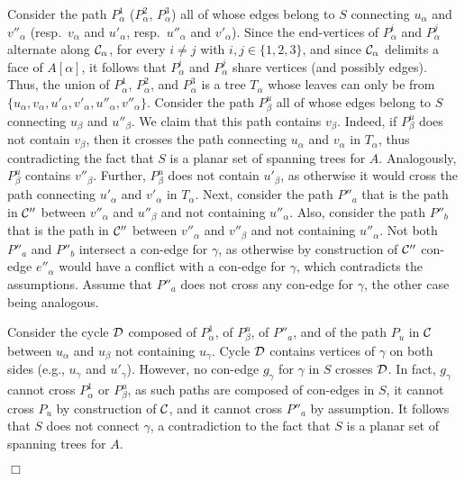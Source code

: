 \documentclass[letter,runningheads]{llncs}
\renewenvironment{proof}
{{\em Proof.\ }}{\hspace*{\fill}$\Box$\par\vspace{2mm}}
\begin{document}
\begin{proof}
Consider the path $P^1_{\alpha}$ ($P^2_{\alpha}$, $P^3_{\alpha}$) all of whose edges belong to $S$ connecting $u_{\alpha}$ and $v''_{\alpha}$ (resp.\ $v_{\alpha}$ and $u'_{\alpha}$, resp.\ $u''_{\alpha}$ and $v'_{\alpha}$). Since the end-vertices of $P^i_{\alpha}$ and $P^j_{\alpha}$ alternate along ${\cal C}_{\alpha}$, for every $i\neq j$ with $i,j\in\{1,2,3\}$, and since ${\cal C}_{\alpha}$ delimits a face of $A[\alpha]$, it follows that $P^i_{\alpha}$ and $P^j_{\alpha}$ share vertices (and possibly edges). Thus, the union of $P^1_{\alpha}$, $P^2_{\alpha}$, and $P^3_{\alpha}$ is a tree $T_{\alpha}$ whose leaves can only be from $\{u_{\alpha},v_{\alpha},u'_{\alpha},v'_{\alpha},u''_{\alpha},v''_{\alpha}\}$. Consider the path $P^u_{\beta}$ all of whose edges belong to $S$ connecting $u_{\beta}$ and $u''_{\beta}$. We claim that this path contains $v_{\beta}$. Indeed, if $P^u_{\beta}$ does not contain $v_{\beta}$, then it crosses the path connecting $u_{\alpha}$ and $v_{\alpha}$ in $T_{\alpha}$, thus contradicting the fact that $S$ is a planar set of spanning trees for $A$. Analogously, $P^u_{\beta}$ contains $v''_{\beta}$. Further, $P^u_{\beta}$ does not contain $u'_{\beta}$, as otherwise it would cross the path connecting $u'_{\alpha}$ and $v'_{\alpha}$ in $T_{\alpha}$. Next, consider the path $P''_a$ that is the path in ${\cal C}''$ between $v''_{\alpha}$ and $u''_{\beta}$ and not containing $u''_{\alpha}$. Also, consider the path $P''_b$ that is the path in ${\cal C}''$ between $v''_{\alpha}$ and $v''_{\beta}$ and not containing $u''_{\alpha}$. Not both $P''_a$ and $P''_b$ intersect a con-edge for $\gamma$, as otherwise by construction of ${\cal C}''$ con-edge $e''_{\alpha}$ would have a conflict with a con-edge for $\gamma$, which contradicts the assumptions. Assume that $P''_a$ does not cross any con-edge for $\gamma$, the other case being analogous.

Consider the cycle ${\cal D}$ composed of $P^1_{\alpha}$, of $P^u_{\beta}$, of $P''_a$, and of the path $P_u$ in $\cal C$ between $u_{\alpha}$ and $u_{\beta}$ not containing $u_{\gamma}$. Cycle ${\cal D}$ contains vertices of $\gamma$ on both sides (e.g., $u_{\gamma}$ and $u'_{\gamma}$). However, no con-edge $g_{\gamma}$ for $\gamma$ in $S$ crosses ${\cal D}$. In fact, $g_{\gamma}$ cannot cross $P^1_{\alpha}$ or $P^u_{\beta}$, as such paths are composed of con-edges in $S$, it cannot cross $P_u$ by construction of $\cal C$, and it cannot cross $P''_a$ by assumption. It follows that $S$ does not connect $\gamma$, a contradiction to the fact that $S$ is a planar set of spanning trees for $A$.


\end{proof}
\end{document}
